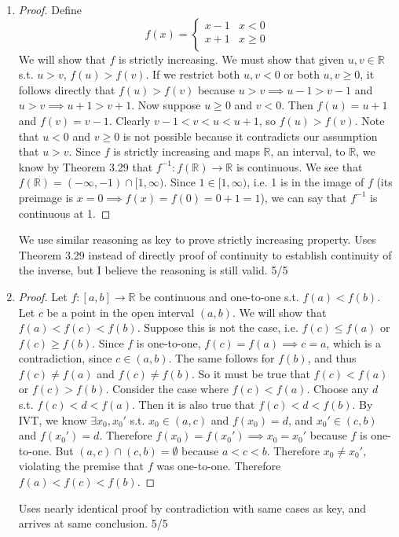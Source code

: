 \documentclass{article}
\begin{document}
\begin{enumerate}
    \item {} 
    \begin{proof}
      Define 
      \[
        f(x) = \begin{cases}
          x-1 & x < 0\\
          x+1 & x \geq 0\\
        \end{cases}
      \]
      We will show that $f$ is strictly increasing.
      We must show that given $u,v\in\mathbb{R}$
      s.t. $u > v$, 
      $f(u) > f(v)$.
      If we restrict both $u,v<0$
      or both $u,v\geq 0$,
      it follows directly that $f(u) > f(v)$
      because $u > v \implies u - 1 > v - 1$
      and $u > v \implies u + 1 > v + 1$.
      Now suppose $u\geq 0$ and $v < 0$.
      Then $f(u) = u + 1$ and $f(v) = v - 1$.
      Clearly $v - 1 < v < u < u + 1$,
      so $f(u) > f(v)$.
      Note that $u < 0$ and $v \geq 0$
      is not possible because it contradicts
      our assumption that $u > v$.
      Since $f$ is strictly increasing
      and maps $\mathbb{R}$, an interval,
      to $\mathbb{R}$, 
      we know by Theorem 3.29
      that $f^{-1}: f(\mathbb{R}) \to \mathbb{R}$
      is continuous.
      We see that $f(\mathbb{R}) = (-\infty, -1)\cap[1, \infty)$.
      Since $1 \in [1, \infty)$, i.e. 
      1 is in the image of $f$ (its preimage is 
      $x=0\implies f(x)=f(0)=0+1=1$),
      we can say that $f^{-1}$
      is continuous at 1.
    \end{proof}
    
    \color{Red}
    We use similar reasoning as key to prove strictly increasing property. 
    Uses Theorem 3.29 instead of directly proof of continuity to 
    establish continuity of the inverse, but I believe the reasoning is 
    still valid. 5/5
    \color{Black}

    \item {} \begin{proof}
      Let $f:[a,b]\to\mathbb{R}$
      be continuous and one-to-one
      s.t. $f(a)<f(b)$.
      Let $c$ be a point in the open interval $(a,b)$.
      We will show that $f(a) < f(c) < f(b)$.
      Suppose this is not the case,
      i.e. $f(c) \leq f(a)$ 
      or $f(c) \geq f(b)$.
      Since $f$ is one-to-one,
      $f(c) = f(a)\implies c=a$,
      which is a contradiction,
      since $c \in (a,b)$.
      The same follows for $f(b)$,
      and thus $f(c) \neq f(a)$
      and $f(c) \neq f(b)$.
      So it must be true
      that $f(c) < f(a)$
      or $f(c) > f(b)$.
      Consider the case where $f(c) < f(a)$.
      Choose any $d$
      s.t. $f(c) < d < f(a)$.
      Then it is also true that 
      $f(c) < d < f(b)$.
      By IVT, we 
      know $\exists x_0, x_0'$
      s.t. $x_0 \in (a, c)$ and $f(x_0) = d$,
      and $x_0'\in (c, b)$ and $f(x_0') = d$.
      Therefore $f(x_0)=f(x_0')\implies x_0=x_0'$ 
      because $f$ is one-to-one.
      But $(a, c) \cap (c, b) = \emptyset$ 
      because $a < c < b$. Therefore
      $x_0 \neq x_0'$,
      violating the premise that $f$ was one-to-one.
      Therefore $f(a) < f(c) < f(b)$.
    \end{proof}

    \color{Red}
    Uses nearly identical proof by contradiction with 
    same cases as key, and arrives at same conclusion. 5/5
    \color{Black}
\end{enumerate}
\end{document}

